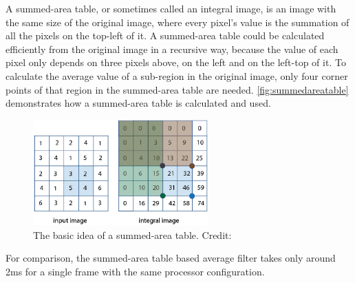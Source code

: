 A summed-area table, or sometimes called an integral image, is an image with the same size of the original image, where every pixel's value is the summation of all the pixels on the top-left of it. A summed-area table could be calculated efficiently from the original image in a recursive way, because the value of each pixel only depends on three pixels above, on the left and on the left-top of it.
To calculate the average value of a sub-region in the original image, only four corner points of that region in the summed-area table are needed. \autoref{fig:summedareatable} demonstrates how a summed-area table is calculated and used.

\begin{figure}
  \centering
  \includegraphics[width=0.6\textwidth]{figures/summedareatable.png}
  \caption{The basic idea of a summed-area table. Credit: \cite{summedareatableimage}}\label{fig:summedareatable}
\end{figure}


For comparison, the summed-area table based average filter takes only around 2ms for a single frame with the same processor configuration.
